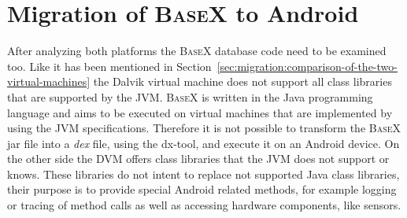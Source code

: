 \section{Migration of \textsc{BaseX} to Android}
\label{sec:migration:migration-of-basex-to-android}
After analyzing both platforms the \textsc{BaseX} database code need to be examined too.
Like it has been mentioned in Section~\ref{sec:migration:comparison-of-the-two-virtual-machines} the Dalvik virtual machine does not support all class libraries that are supported by the JVM.
\textsc{BaseX} is written in the Java programming language and aims to be executed on virtual machines that are implemented by using the JVM specifications.
Therefore it is not possible to transform the \textsc{BaseX} jar file into a \textit{dex} file, using the dx-tool, and execute it on an Android device.
On the other side the DVM offers class libraries that the JVM does not support or knows.
These libraries do not intent to replace not supported Java class libraries, their purpose is to provide special Android related methods, for example logging or tracing of method calls as well as accessing hardware components, like sensors. 


